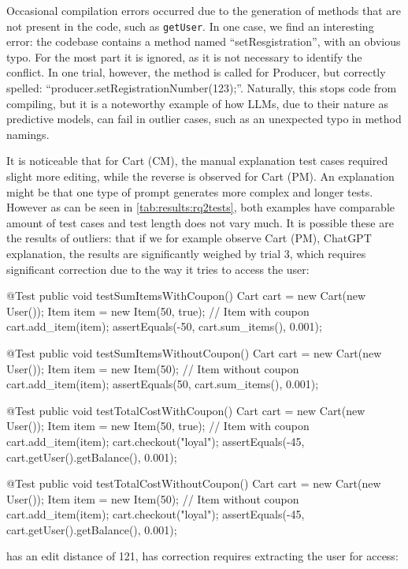 Occasional compilation errors occurred due to the generation of methods that are not present in the code, such as \texttt{getUser}.
In one case, we find an interesting error: the codebase contains a method named ``setResgistration'', with an obvious typo.
For the most part it is ignored, as it is not necessary to identify the conflict. In one trial, however,
the method is called for Producer, but correctly spelled: ``producer.setRegistrationNumber(123);''.
Naturally, this stops code from compiling, but it is a noteworthy example of how LLMs, due to their nature as
predictive models, can fail in outlier cases, such as an unexpected typo in method namings.

It is noticeable that for Cart (CM), the manual explanation test cases required slight more editing, while the reverse
is observed for Cart (PM). An explanation might be that one type of prompt generates more complex and longer tests. However as can be seen in
\cref{tab:results:rq2tests}, both examples have comparable amount of test cases and test length does not vary much.
It is possible these are the results of outliers: that if we for example observe Cart (PM), ChatGPT explanation, the results are significantly weighed by
trial 3, which requires significant correction due to the way it tries to access the user:
\begin{response}
@Test
public void testSumItemsWithCoupon() {
    Cart cart = new Cart(new User());
    Item item = new Item(50, true); // Item with coupon
    cart.add_item(item);
    assertEquals(-50, cart.sum_items(), 0.001);
}

@Test
public void testSumItemsWithoutCoupon() {
    Cart cart = new Cart(new User());
    Item item = new Item(50); // Item without coupon
    cart.add_item(item);
    assertEquals(50, cart.sum_items(), 0.001);
}

@Test
public void testTotalCostWithCoupon() {
    Cart cart = new Cart(new User());
    Item item = new Item(50, true); // Item with coupon
    cart.add_item(item);
    cart.checkout("loyal");
    assertEquals(-45, cart.getUser().getBalance(), 0.001);
}

@Test
public void testTotalCostWithoutCoupon() {
    Cart cart = new Cart(new User());
    Item item = new Item(50); // Item without coupon
    cart.add_item(item);
    cart.checkout("loyal");
    assertEquals(-45, cart.getUser().getBalance(), 0.001);
}
\end{response}
has an edit distance of 121, has correction requires extracting the user for access:

